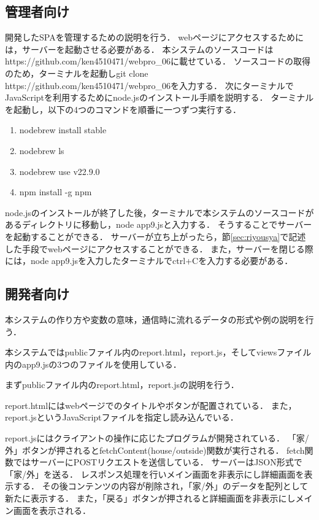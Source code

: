 \documentclass[uplatex,dvipdfmx]{jsarticle}
\begin{document}
\subsection{管理者向け}
開発したSPAを管理するための説明を行う．
webページにアクセスするためには，サーバーを起動させる必要がある．
本システムのソースコードはhttps://github.com/ken4510471/webpro\_06に載せている．
ソースコードの取得のため，ターミナルを起動しgit clone https://github.com/ken4510471/webpro\_06を入力する．
次にターミナルでJavaScriptを利用するためにnode.jsのインストール手順を説明する．
ターミナルを起動し，以下の4つのコマンドを順番に一つずつ実行する．
\begin{enumerate}
    \item nodebrew install stable
    \item nodebrew ls
    \item nodebrew use v22.9.0
    \item npm install -g npm
\end{enumerate}
node.jsのインストールが終了した後，ターミナルで本システムのソースコードがあるディレクトリに移動し，node app9.jsと入力する．
そうすることでサーバーを起動することができる．
サーバーが立ち上がったら，節\ref{sec:riyousya}で記述した手段でwebページにアクセスすることができる．
また，サーバーを閉じる際には，node app9.jsを入力したターミナルでctrl+Cを入力する必要がある．
\subsection{開発者向け}\label{sec:kaihatusya}
本システムの作り方や変数の意味，通信時に流れるデータの形式や例の説明を行う．

本システムではpublicファイル内のreport.html，report.js，そしてviewsファイル内のapp9.jsの3つのファイルを使用している．

まずpublicファイル内のreport.html，report.jsの説明を行う．

report.htmlにはwebページでのタイトルやボタンが配置されている．
また，report.jsというJavaScriptファイルを指定し読み込んでいる．

report.jsにはクライアントの操作に応じたプログラムが開発されている．
「家/外」ボタンが押されるとfetchContent(house/outside)関数が実行される．
fetch関数ではサーバーにPOSTリクエストを送信している．
サーバーはJSON形式で「家/外」を送る．
レスポンス処理を行いメイン画面を非表示にし詳細画面を表示する．
その後コンテンツの内容が削除され，「家/外」のデータを配列として新たに表示する．
また，「戻る」ボタンが押されると詳細画面を非表示にしメイン画面を表示される．
\end{document}
